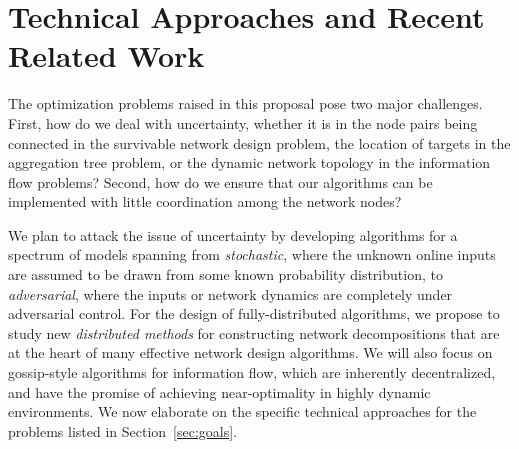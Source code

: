 \section{Technical Approaches and Recent Related Work}
The optimization problems raised in this proposal pose two major
challenges.  First, how do we deal with uncertainty, whether it is in
the node pairs being connected in the survivable network design
problem, the location of targets in the aggregation tree problem, or
the dynamic network topology in the information flow problems?
Second, how do we ensure that our algorithms can be implemented with
little coordination among the network nodes?

We plan to attack the issue of uncertainty by developing algorithms
for a spectrum of models spanning from {\em stochastic}, where the
unknown online inputs are assumed to be drawn from some known
probability distribution, to {\em adversarial}, where the inputs or
network dynamics are completely under adversarial control.  For the
design of fully-distributed algorithms, we propose to study new {\em
  distributed methods}\/ for constructing network decompositions that
are at the heart of many effective network design algorithms.  We will
also focus on gossip-style algorithms for information flow, which are
inherently decentralized, and have the promise of achieving
near-optimality in highly dynamic environments.  We now elaborate on
the specific technical approaches for the problems listed in
Section~\ref{sec:goals}.

%

